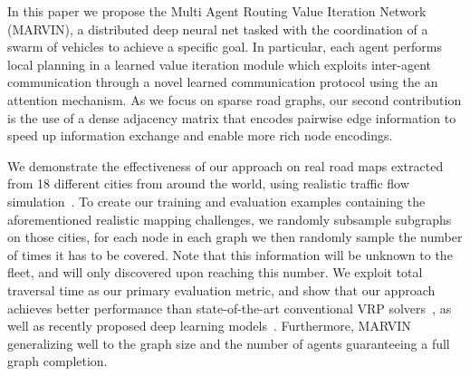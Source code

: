 In this paper we propose the Multi Agent Routing Value Iteration Network (MARVIN), a distributed
deep neural net tasked with the coordination of a swarm of vehicles to achieve a specific goal. In
particular, each agent performs local planning in a learned value iteration module which exploits
inter-agent communication through a novel learned communication protocol using the an attention mechanism.
As we focus on sparse road graphs, our second contribution is the  use of a dense
adjacency matrix that encodes pairwise edge information to speed up information exchange and enable
more rich node encodings.

We demonstrate the effectiveness of our approach on real road maps extracted from 18 different
cities from around the world, using realistic traffic flow
simulation~\citep{macroscopicsim,continuum}.
To create our training and evaluation examples containing the
aforementioned realistic mapping challenges, we randomly subsample subgraphs  on those cities, for
each node in each graph we then randomly sample the number of times it has to be covered. Note that this information will be unknown to the fleet, and will only discovered upon reaching this number.
We exploit total traversal time as our primary evaluation metric, and show that
our approach achieves better performance than state-of-the-art conventional VRP solvers~\citep{lkh3}, as well as recently proposed deep learning
models~\citep{am, ean, gvin}. Furthermore, MARVIN
generalizing well  to the graph size and the number of agents guaranteeing a full
graph completion.
